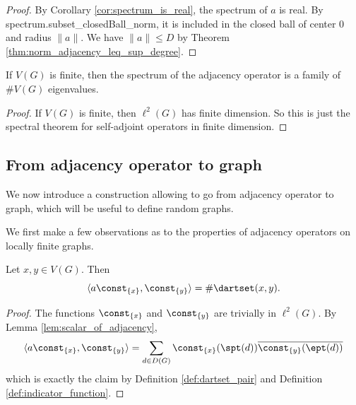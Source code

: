 \begin{proof}
  By Corollary \ref{cor:spectrum_is_real}, the spectrum of $a$ is real.
  By spectrum.subset\_closedBall\_norm,
  it is included in the closed ball of center $0$ and
  radius $\|a\|$.
  We have $\|a\| \leq D$ by Theorem \ref{thm:norm_adjacency_leq_sup_degree}.
\end{proof}

\begin{lemma}
  \label{lem:spectrum_finite}
  If $V(G)$ is finite, then the spectrum of the adjacency operator
  is a family of $\# V(G)$ eigenvalues.
\end{lemma}

\begin{proof}
  If $V(G)$ is finite, then $\ell^2(G)$ has finite dimension.
  So this is just the spectral theorem for self-adjoint operators in finite
  dimension.
\end{proof}

\subsection{From adjacency operator to graph}

We now introduce a construction allowing to go from adjacency operator to graph,
which will be useful to define random graphs.

We first make a few observations as to the properties of adjacency operators on locally
finite graphs.

\begin{lemma}
  \label{lem:coefficients_adjacency_expression}
  Let $x, y \in V(G)$. Then
  \begin{equation*}
    \langle a \const_{\{x\}}, \const_{\{y\}} \rangle
    = \# \dartset(x,y).
  \end{equation*}
\end{lemma}

\begin{proof}
  The functions $\const_{\{x\}}$ and $\const_{\{y\}}$ are trivially in $\ell^2(G)$.
  By Lemma \ref{lem:scalar_of_adjacency},
  \begin{equation*}
    \langle a \const_{\{x\}}, \const_{\{y\}} \rangle
    = \sum_{d \in D(G)} \const_{\{x\}}(\spt(d)) \overline{\const_{\{y\}}(\ept(d))}
  \end{equation*}
  which is exactly the claim by Definition \ref{def:dartset_pair} and Definition
  \ref{def:indicator_function}.
\end{proof}

